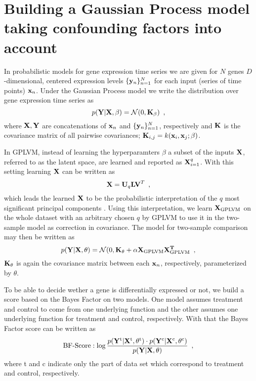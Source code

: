 \documentclass[11pt,a4paper,titlepage,twoside,tablecaptionabove]{article}
\begin{document}
\section{Building a Gaussian Process model taking confounding factors
  into account}
\label{sec:build-gauss-proc}

In probabilistic models for gene expression time series we are given
for $N$ genes $D$-dimensional, centered expression levels $\{{\bf
  y}_n\}_{n=1}^N$ for each input (series of time points) ${\bf
  x}_n$. Under the Gaussian Process model \cite{rasmussen2004gaussian}
we write the distribution over gene expression time series as
\begin{equation}
  \label{eq:1}
  p({\bf Y}|{\bf X},\beta) = \mathcal N(0, {\bf K_\beta})\enspace,
\end{equation}
where ${\bf X,Y}$ are concatenations of ${\bf x}_n$ and $\{{\bf
  y}_n\}_{n=1}^N$, respectively and ${\bf K}$ is the covariance matrix
of all pairwise covariances; ${\bf K}_{i,j} = k({\bf x}_i, {\bf
  x}_j;\beta)$.

In GPLVM, instead of learning the hyperparamters $\beta$ a subset of
the inputs ${\bf X}$, referred to as the latent space, are learned and
reported as ${\bf X}_{i=1}^q$. With this setting learning $\bf X$ can
be written as
\begin{equation}
  \label{eq:2}
  {\bf X} = {\bf U}_q{\bf LV}^T\enspace,
\end{equation}
which leads the learned ${\bf X}$ to be the probabilistic
interpretation of the $q$ most significant principal components
\cite{lawrence2004gaussian}. Using this interpretation, we learn ${\bf
  X_{\text{GPLVM}}}$ on the whole dataset with an arbitrary chosen $q$
by GPLVM to use it in the two-sample model as correction in
covariance. The model for two-sample comparison may then be written as
\begin{equation}
  \label{eq:3}
  p({\bf Y}|{\bf X},\theta) = \mathcal N(0, {\bf K_\theta} +
  \alpha {\bf X_\text{GPLVM}}\bf X_\text{GPLVM}^T\enspace, 
\end{equation}
${\bf K}_\theta$ is again the covariance matrix between each ${\bf
  x}_n$, respectively, parameterized by $\theta$.

To be able to decide wether a gene is differentially expressed or not,
we build a score based on the Bayes Factor on two models. One model
assumes treatment and control to come from one underlying function and
the other assumes one underlying function for treatment and control,
respectively. With that the Bayes Factor score can be written as
\begin{equation}
  \label{eq:4}
  \text{BF-Score}: \log\frac{p({\bf Y}^\text{t}|{\bf
      X}^\text{t},\theta^\text{t})\cdot p({\bf Y}^\text{c}|{\bf X}^\text{c},\theta^\text{c})}{p({\bf Y}|{\bf X},\theta)}\enspace,
\end{equation}
where t and c indicate only the part of data set which correspond to
treatment and control, respectively.

 
\end{document}
